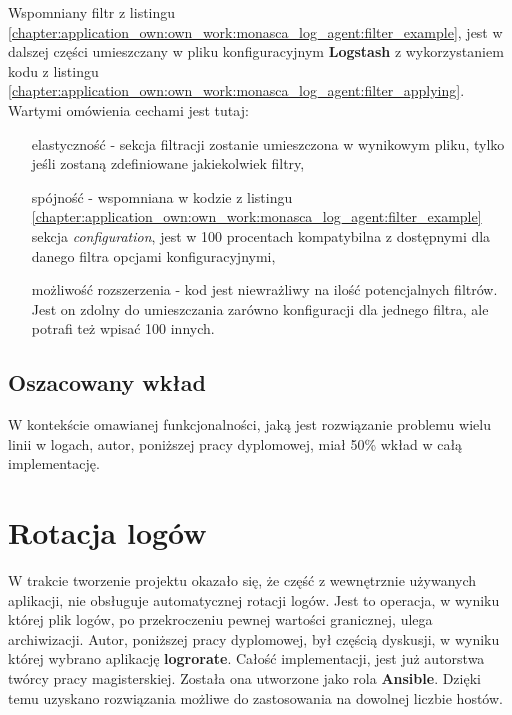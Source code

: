     Wspomniany filtr z listingu \ref{chapter:application_own:own_work:monasca_log_agent:filter_example}, jest w dalszej części 
    umieszczany w pliku konfiguracyjnym \textbf{Logstash} z wykorzystaniem kodu z listingu 
    \ref{chapter:application_own:own_work:monasca_log_agent:filter_applying}. 
    Wartymi omówienia cechami jest tutaj:
    \begin{itemize}
        \item[elastyczność] - sekcja filtracji zostanie umieszczona w wynikowym pliku, tylko jeśli zostaną zdefiniowane jakiekolwiek filtry,
        \item[spójność] - wspomniana w kodzie z listingu \ref{chapter:application_own:own_work:monasca_log_agent:filter_example} 
        sekcja \textit{configuration}, jest w 100 procentach kompatybilna z dostępnymi dla danego filtra opcjami konfiguracyjnymi,
        \item[możliwość rozszerzenia] - kod jest niewrażliwy na ilość potencjalnych filtrów. Jest on zdolny do umieszczania zarówno konfiguracji dla jednego
        filtra, ale potrafi też wpisać 100 innych. 
    \end{itemize}

    \subsection{Oszacowany wkład}
    W kontekście omawianej funkcjonalności, jaką jest rozwiązanie problemu wielu linii w logach, autor, poniższej
    pracy dyplomowej, miał 50\% wkład w całą implementację. 

\section{Rotacja logów}
    W trakcie tworzenie projektu okazało się, że część z wewnętrznie używanych aplikacji, nie obsługuje automatycznej rotacji 
    logów. Jest to operacja, w wyniku której plik logów, po przekroczeniu pewnej wartości granicznej, ulega archiwizacji. 
    Autor, poniższej pracy dyplomowej, był częścią dyskusji, w wyniku której wybrano aplikację \textbf{logrorate}. Całość 
    implementacji, jest już autorstwa twórcy pracy magisterskiej. Została ona utworzone jako rola \textbf{Ansible}. Dzięki 
    temu uzyskano rozwiązania możliwe do zastosowania na dowolnej liczbie hostów.

